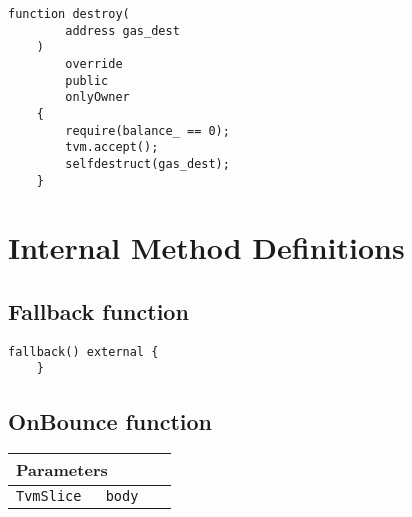 \vspace{2cm}

\begin{lstlisting}[firstnumber=584]
    function destroy(
        address gas_dest
    )
        override
        public
        onlyOwner
    {
        require(balance_ == 0);
        tvm.accept();
        selfdestruct(gas_dest);
    }
\end{lstlisting}

\section{Internal Method Definitions}


\subsection{Fallback function}

\vspace{2cm}

\begin{lstlisting}[firstnumber=683]
    fallback() external {
    }
\end{lstlisting}

\subsection{OnBounce function}


\ifsoltables
\noindent\begin{tabular}{|l|l|p{5cm}|}\hline
\multicolumn{3}{|l|}{\bf Parameters}\\\hline
\tt TvmSlice & \tt body &\\\hline
\end{tabular}
\fi

\vspace{2cm}

